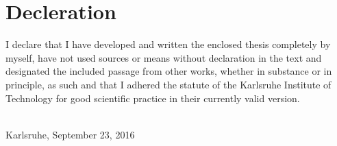 \thispagestyle{empty}


\vspace*{8cm}


\section*{Decleration}

 I declare that I have developed and written the enclosed thesis completely by myself, have not used sources or means without declaration in the text and designated the included passage from other works, whether in substance or in principle, as such and that I adhered the statute of the Karlsruhe Institute of Technology for good scientific practice in their currently valid version.


~\\[2ex] 
\noindent
Karlsruhe, September 23, 2016 %
~\\[5ex]
